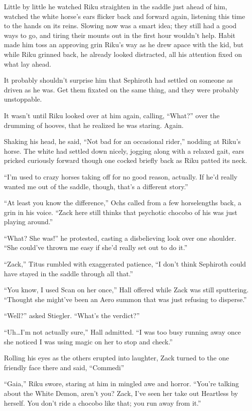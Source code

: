 Little by little he watched Riku straighten in the saddle just ahead of him, watched the white horse's ears flicker back and forward again, listening this time to the hands on its reins. Slowing now was a smart idea; they still had a good ways to go, and tiring their mounts out in the first hour wouldn't help. Habit made him toss an approving grin Riku's way as he drew apace with the kid, but while Riku grinned back, he already looked distracted, all his attention fixed on what lay ahead.

It probably shouldn't surprise him that Sephiroth had settled on someone as driven as he was. Get them fixated on the same thing, and they were probably unstoppable.

It wasn't until Riku looked over at him again, calling, ``What?'' over the drumming of hooves, that he realized he was staring. Again.

Shaking his head, he said, ``Not bad for an occasional rider,'' nodding at Riku's horse. The white had settled down nicely, jogging along with a relaxed gait, ears pricked curiously forward though one cocked briefly back as Riku patted its neck.

``I'm used to crazy horses taking off for no good reason, actually. If he'd really wanted me out of the saddle, though, that's a different story.''

``At least you know the difference,'' Ochs called from a few horselengths back, a grin in his voice. ``Zack here still thinks that psychotic chocobo of his was just playing around.''

``What? She was!'' he protested, casting a disbelieving look over one shoulder. ``She could've thrown me easy if she'd really set out to do it.''

``Zack,'' Titus rumbled with exaggerated patience, ``I don't think Sephiroth could have stayed in the saddle through all that.''

``You know, I used Scan on her once,'' Hall offered while Zack was still sputtering. ``Thought she might've been an Aero summon that was just refusing to disperse.''

``Well?'' asked Stiegler. ``What's the verdict?''

``Uh\ldots I'm not actually sure,'' Hall admitted. ``I was too busy running away once she noticed I was using magic on her to stop and check.''
\begin{sloppypar}
Rolling his eyes as the others erupted into laughter, Zack turned to the one friendly face there and said, ``Commedi\textemdash ''
\end{sloppypar}
``Gaia,'' Riku swore, staring at him in mingled awe and horror. ``You're talking about the White Demon, aren't you? Zack, I've seen her take out Heartless by herself. You don't ride a chocobo like that; you run away from it.''

